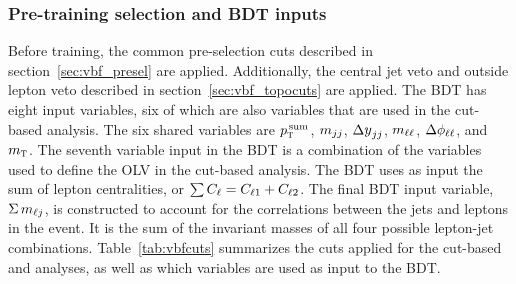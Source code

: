 \subsubsection{Pre-training selection and BDT inputs}
Before training, the common pre-selection cuts described in section~\ref{sec:vbf_presel} are applied. Additionally, the central jet veto and outside lepton veto described in section~\ref{sec:vbf_topocuts} are applied. The BDT has eight input variables, six of which are also variables that are used in the cut-based analysis. The six shared variables are $p_{\textrm{\footnotesize\sc t}}^{\,\rm sum}$, $m_{jj}$, $\dyjj$, $m_{\ell\ell}$, $\Delta\phi_{\ell\ell}$, and $m_{\textrm{\footnotesize\sc t}}$. The seventh variable input in the BDT is a combination of the variables used to define the OLV in the cut-based analysis. The BDT uses as input the sum of lepton centralities, or $\sum C_{\ell} = C_{\ell1} + C_{\ell2}$. The final BDT input variable, $\Sigma\,m_{\ell j}$, is constructed to account for the correlations between the jets and leptons in the event. It is the sum of the invariant masses of all four possible lepton-jet combinations. Table~\ref{tab:vbfcuts} summarizes the cuts applied for the cut-based and analyses, as well as which variables are used as input to the BDT.


